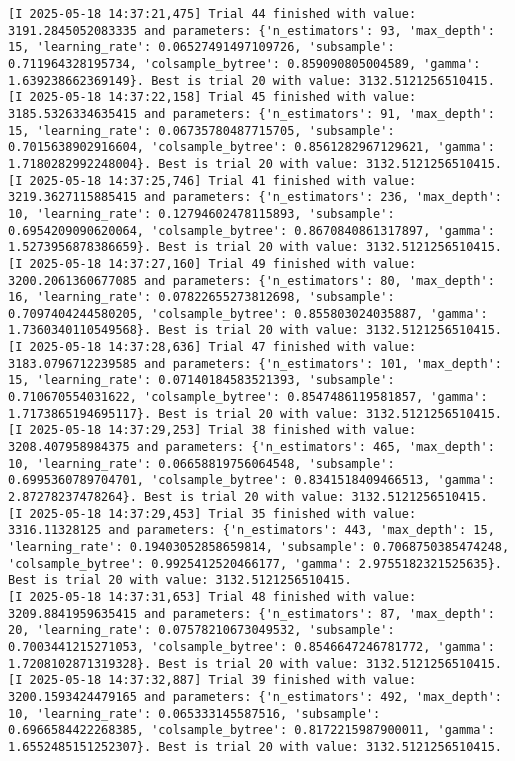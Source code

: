 \documentclass[
  letterpaper,
  DIV=11,
  numbers=noendperiod]{scrreprt}
\begin{document}
\begin{verbatim}
[I 2025-05-18 14:37:21,475] Trial 44 finished with value: 3191.2845052083335 and parameters: {'n_estimators': 93, 'max_depth': 15, 'learning_rate': 0.06527491497109726, 'subsample': 0.711964328195734, 'colsample_bytree': 0.859090805004589, 'gamma': 1.639238662369149}. Best is trial 20 with value: 3132.5121256510415.
[I 2025-05-18 14:37:22,158] Trial 45 finished with value: 3185.5326334635415 and parameters: {'n_estimators': 91, 'max_depth': 15, 'learning_rate': 0.06735780487715705, 'subsample': 0.7015638902916604, 'colsample_bytree': 0.8561282967129621, 'gamma': 1.7180282992248004}. Best is trial 20 with value: 3132.5121256510415.
[I 2025-05-18 14:37:25,746] Trial 41 finished with value: 3219.3627115885415 and parameters: {'n_estimators': 236, 'max_depth': 10, 'learning_rate': 0.12794602478115893, 'subsample': 0.6954209090620064, 'colsample_bytree': 0.8670840861317897, 'gamma': 1.5273956878386659}. Best is trial 20 with value: 3132.5121256510415.
[I 2025-05-18 14:37:27,160] Trial 49 finished with value: 3200.2061360677085 and parameters: {'n_estimators': 80, 'max_depth': 16, 'learning_rate': 0.07822655273812698, 'subsample': 0.7097404244580205, 'colsample_bytree': 0.855803024035887, 'gamma': 1.7360340110549568}. Best is trial 20 with value: 3132.5121256510415.
[I 2025-05-18 14:37:28,636] Trial 47 finished with value: 3183.0796712239585 and parameters: {'n_estimators': 101, 'max_depth': 15, 'learning_rate': 0.07140184583521393, 'subsample': 0.710670554031622, 'colsample_bytree': 0.8547486119581857, 'gamma': 1.7173865194695117}. Best is trial 20 with value: 3132.5121256510415.
[I 2025-05-18 14:37:29,253] Trial 38 finished with value: 3208.407958984375 and parameters: {'n_estimators': 465, 'max_depth': 10, 'learning_rate': 0.06658819756064548, 'subsample': 0.6995360789704701, 'colsample_bytree': 0.8341518409466513, 'gamma': 2.87278237478264}. Best is trial 20 with value: 3132.5121256510415.
[I 2025-05-18 14:37:29,453] Trial 35 finished with value: 3316.11328125 and parameters: {'n_estimators': 443, 'max_depth': 15, 'learning_rate': 0.19403052858659814, 'subsample': 0.7068750385474248, 'colsample_bytree': 0.9925412520466177, 'gamma': 2.9755182321525635}. Best is trial 20 with value: 3132.5121256510415.
[I 2025-05-18 14:37:31,653] Trial 48 finished with value: 3209.8841959635415 and parameters: {'n_estimators': 87, 'max_depth': 20, 'learning_rate': 0.07578210673049532, 'subsample': 0.7003441215271053, 'colsample_bytree': 0.8546647246781772, 'gamma': 1.7208102871319328}. Best is trial 20 with value: 3132.5121256510415.
[I 2025-05-18 14:37:32,887] Trial 39 finished with value: 3200.1593424479165 and parameters: {'n_estimators': 492, 'max_depth': 10, 'learning_rate': 0.065333145587516, 'subsample': 0.6966584422268385, 'colsample_bytree': 0.8172215987900011, 'gamma': 1.6552485151252307}. Best is trial 20 with value: 3132.5121256510415.

\end{verbatim}
\end{document}
